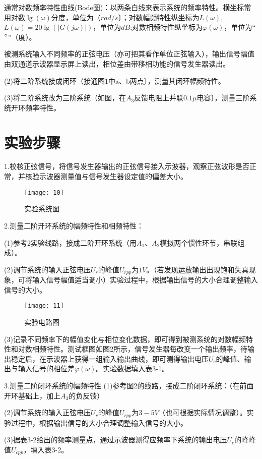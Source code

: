 \documentclass[UTF8,a4paper,10pt]{ctexart}
\begin{document}
	通常对数频率特性曲线(Bode图)：以两条白线来表示系统的频率特性。横坐标常用对数$\lg(\omega)$分度，单位为（$rad/s$〕；对数幅频特性纵坐标为$L(\omega)$,$L(\omega)=20\lg(\left| G(j\omega)\right|)$，单位为$dB$;对数相频特性纵坐标为$\varphi(\omega)$，单位为“$\degree$”（度）。
	
	被测系统输入不同频率的正弦电压（亦可把其看作单位正弦输入），输出信号幅值由双通道示波器显示屏上读出，相位差由带移相功能的信号发生器读出。
	
	(2)将二阶系统接成闭环（接通图1中a、b两点〕，测量其闭环幅频特性。
	
	(3)将二阶系统改为三阶系统（如图，在$A_{3}$反馈电阻上并联$0.1\mu$电容〕，测量三阶系统开环频率特性。
	
\section{实验步骤}
	1.校核正弦信号，将信号发生器输出的正弦信号接入示波器，观察正弦波形是否正常，并核验示波器测量值与信号发生器设定值的偏差大小。
	\begin{figure}[h]
		\centering
		\texttt{[image: 10]}
		\caption{实验系统图}
	\end{figure}

	2.测量二阶开环系统的幅频特性和相频特性：
	
	(1)参考2实验线路，接成二阶开环系统（用$A_{1}$、$A_{2}$模拟两个惯性环节，串联组成）。
	
	(2)调节系统的输入正弦电压$U_{r}$的峰值$U_{rpp}$为$1V$。（若发现运放输出出现饱和失真现象，可将输入信号幅值适当调小）实验过程中，根据输出信号的大小合理调整输入信号的大小。
	
	\begin{figure}[h]
		\centering
		\texttt{[image: 11]}
		\caption{实验电路图}
	\end{figure}

	(3)记录不同频率下的幅值变化与相位变化数据，即可得到被测系统的对数幅频特性和对数相频特性。测试框图如图2所示，信号发生器每改变一个输出频率，待输出稳定后，在示波器上获得一组输入输出曲线，即可测得输出电压$U_{c}$的峰值、输出与输入信号的相位差$\varphi(\omega)$。实验数据填入表3-1。
	
	3.测量二阶闭环系统的幅频特性
	(1)参考图2的线路，接成二阶闭环系统：（在前面开环基础上，加上$A_{3}$的负反馈）
	
	(2)调节系统的输入正弦电压$U_{r}$的峰值$U_{rpp}$为$3-5V$（也可根据实际情况调整）。实验过程中，根据输出信号的大小合理调整输入信号的大小。
	
	(3)据表3-2给出的频率测量点，通过示波器测得应频率下系统的输出电压$U_{c}$的峰峰值$U_{cpp}$，填入表3-2。
\end{document}
